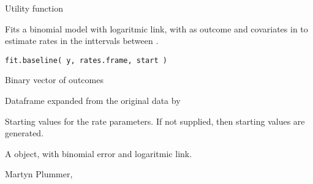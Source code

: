\begin{Description}\relax
Utility function

Fits a binomial model with logaritmic link, with  as outcome
and covariates in  to estimate rates in the
inttervals between .
\end{Description}
\begin{Usage}
\begin{verbatim}
fit.baseline( y, rates.frame, start )
\end{verbatim}
\end{Usage}
\begin{Arguments}
\begin{ldescription}
\item[\code{y}] Binary vector of outcomes
\item[\code{rates.frame}] Dataframe expanded from the original data by
\item[\code{start}] Starting values for the rate parameters. If not supplied,
then starting values are generated.
\end{ldescription}
\end{Arguments}
\begin{Value}
A  object, with binomial error and logaritmic link.
\end{Value}
\begin{Author}\relax
Martyn Plummer, 
\end{Author}
\begin{SeeAlso}\relax
{}
\end{SeeAlso}
\begin{Examples}
\begin{ExampleCode}
  \end{ExampleCode}
\end{Examples}

